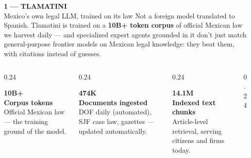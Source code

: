 \documentclass[aspectratio=169,11pt]{beamer}
\newcommand{\kicker}[1]{{\footnotesize\bfseries\color{emerald}\uppercase{#1}}}
\newcommand{\muted}[1]{\textcolor{muted}{#1}}
\newcommand{\acc}[1]{\textcolor{emerald}{#1}}
\begin{document}
\begingroup
{}
\begin{frame}{\kicker{1 — Tlamatini}\\[2pt] {\color{white}Mexico's own legal LLM,} \acc{trained on its law}}
  \muted{\footnotesize Not a foreign model translated to Spanish. Tlamatini is trained on a
  \textbf{\color{mint}10B+ token corpus} of official Mexican law we harvest daily — and
  specialized expert agents grounded in it don't just match general-purpose frontier
  models on Mexican legal knowledge: they beat them, with citations instead of guesses.}
  \vspace{6pt}
  \begin{columns}[T]
    \begin{column}{0.24\textwidth}
      \begin{darkcard}
        {\fontsize{19}{19}\selectfont\bfseries\color{mint}10B+}\\[3pt]
        {\footnotesize\bfseries\color{white}Corpus tokens}\\[2pt]
        {\scriptsize\color{white!60!bgdark}Official Mexican law — the training ground of the model.}
      \end{darkcard}
    \end{column}
    \begin{column}{0.24\textwidth}
      \begin{darkcard}
        {\fontsize{19}{19}\selectfont\bfseries\color{mint}474K}\\[3pt]
        {\footnotesize\bfseries\color{white}Documents ingested}\\[2pt]
        {\scriptsize\color{white!60!bgdark}DOF daily (automated), SJF case law, gazettes — updated automatically.}
      \end{darkcard}
    \end{column}
    \begin{column}{0.24\textwidth}
      \begin{darkcard}
        {\fontsize{19}{19}\selectfont\bfseries\color{mint}14.1M}\\[3pt]
        {\footnotesize\bfseries\color{white}Indexed text chunks}\\[2pt]
        {\scriptsize\color{white!60!bgdark}Article-level retrieval, serving citizens and firms today.}
      \end{darkcard}
    \end{column}
    \begin{column}{0.24\textwidth}

\end{column}
\end{columns}
\end{frame}
\end{document}
